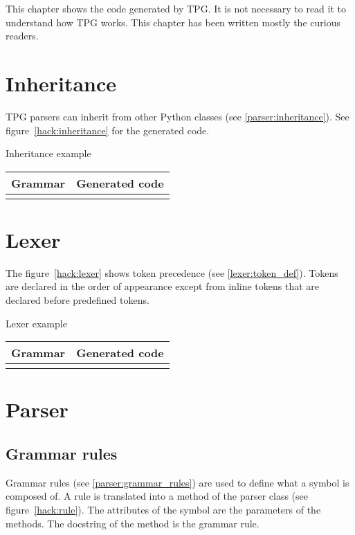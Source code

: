 
\newcommand{\hack}[3]
{
	\begin{tableau}
	\caption{#2}											\label{#3}
	\begin{tabular}{| p{6cm} | p{8cm} | }
	\hline
		Grammar & Generated code \\
	\hline
	\hline
		{ \scriptsize \verbatimtabinput[4]{hack/#1.g} }
		&
		{ \scriptsize \verbatimtabinput[4]{hack/#1.py} }
		\\
	\hline
	\end{tabular}
	\end{tableau}
}

This chapter shows the code generated by TPG.
It is not necessary to read it to understand how TPG works.
This chapter has been written mostly the curious readers.

\section{Inheritance}

TPG parsers can inherit from other Python classes (see \ref{parser:inheritance}).
See figure~\ref{hack:inheritance} for the generated code.

\hack{baseclasses}{Inheritance example}{hack:inheritance}

\clearpage
\section{Lexer}

The figure~\ref{hack:lexer} shows token precedence (see \ref{lexer:token_def}).
Tokens are declared in the order of appearance except from inline tokens that are declared before predefined tokens.

\hack{lexer}{Lexer example}{hack:lexer}

\clearpage
\section{Parser}

\subsection{Grammar rules}

Grammar rules (see \ref{parser:grammar_rules}) are used to define what a symbol is composed of.
A rule is translated into a method of the parser class (see figure~\ref{hack:rule}).
The attributes of the symbol are the parameters of the methods.
The docstring of the method is the grammar rule.

